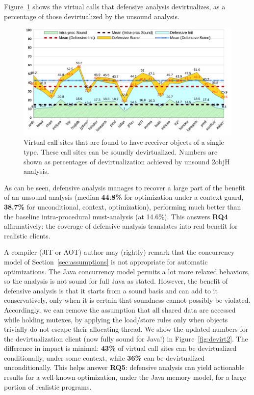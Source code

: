 Figure~\ref{fig:devirt1}
shows the virtual calls that defensive analysis devirtualizes, as a
percentage of those devirtualized by the unsound analysis.
\begin{figure}[tbhp]
  \begin{minipage}[b]{\linewidth}
    \centering
    \includegraphics[width=\linewidth]{assets/defensive/devirt1.pdf}
  \end{minipage}
  \caption{Virtual call sites that are found to have receiver objects
    of a single type. These call sites can be soundly devirtualized.
    Numbers are shown as percentages of devirtualization achieved by
    unsound 2objH analysis.}
    \label{fig:devirt1}
\end{figure}

As can be
seen, defensive analysis manages to recover a large part of the
benefit of an unsound analysis (median \textbf{44.8\%} for
optimization under a context guard, \textbf{38.7\%} for unconditional,
 context, optimization), performing much better than
the baseline intra-procedural must-analysis (at 14.6\%). This answers
\textbf{RQ4} affirmatively: the coverage of defensive analysis translates
into real benefit for realistic clients.


A compiler (JIT or AOT) author may (rightly) remark that the
concurrency model of Section~\ref{sec:assumptions} is not appropriate
for automatic optimizations. The Java concurrency model permits a lot
more relaxed behaviors, so the analysis is not sound for full Java as
stated. However, the benefit of defensive analysis is that it starts
from a sound basis and can add to it conservatively, only when it is
certain that soundness cannot possibly be violated. Accordingly, we
can remove the assumption that all shared data are accessed while
holding mutexes, by applying the load/store rules only when objects
trivially do not escape their allocating thread. We show the updated
numbers for the devirtualization client (now fully sound for Java!) in
Figure~\ref{fig:devirt2}. The difference in impact is minimal: \textbf{43\%} of
virtual call sites can be devirtualized conditionally, under some
context, while \textbf{36\%} can be devirtualized unconditionally. This
helps answer \textbf{RQ5}: defensive analysis can yield actionable results
for a well-known optimization, under the Java memory model, for a
large portion of realistic programs.

